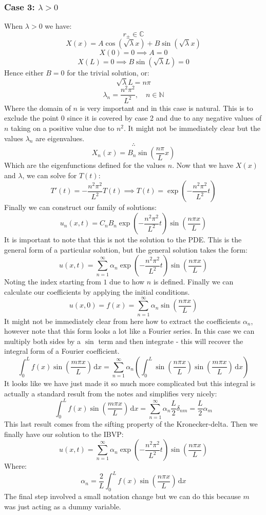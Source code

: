 \documentclass[12pt]{article}
\begin{document}
\subsubsection{Case 3: \(\lambda>0\)}
When \(\lambda>0\) we have:
\[r_{\pm}\in \mathbb{C}\]
\[X(x)=A\cos(\sqrt{\lambda}x)+B\sin(\sqrt{\lambda}x)\]
\[X(0)=0\implies A=0\]
\[X(L)=0\implies B\sin(\sqrt{\lambda}L)=0\]
Hence either \(B=0\) for the trivial solution, or:
\[\sqrt{\lambda}L=n\pi\]
\[\lambda_n=\frac{n^2\pi^2}{L^2},\quad n\in\mathbb{N}\]
Where the domain of \(n\) is very important and in this case is natural. This is to exclude the point \(0\) since it is covered by case 2 and due to any negative values of \(n\) taking on a positive value due to \(n^2\). It might not be immediately clear but the values \(\lambda_n\) are eigenvalues.
\[\therefore\]
\[X_n(x)=B_n\sin\left(\frac{n\pi}{L}x\right)\]
Which are the eigenfunctions defined for the values \(n\). Now that we have \(X(x)\) and \(\lambda\), we can solve for \(T(t)\):
\[T'(t)=-\frac{n^2\pi^2}{L^2}T(t)\implies T(t)=\exp\left(-\frac{n^2\pi^2}{L^2}t\right)\]
Finally we can construct our family of solutions:
\[u_n(x,t)=C_nB_n\exp\left(-\frac{n^2\pi^2}{L^2}t\right)\sin\left(\frac{n\pi x}{L}\right)\]
It is important to note that this is not the solution to the PDE. This is the general form of a particular solution, but the general solution takes the form:
\[u(x,t)=\sum^\infty_{n=1}\alpha_n\exp\left(-\frac{n^2\pi^2}{L^2}t\right)\sin\left(\frac{n\pi x}{L}\right)\]
Noting the index starting from \(1\) due to how \(n\) is defined. Finally we can calculate our coefficients by applying the initial conditions.
\[u(x,0)=f(x)=\sum^\infty_{n=1}\alpha_n\sin\left(\frac{n\pi x}{L}\right)\]
It might not be immediately clear from here how to extract the coefficients \(\alpha_n\), however note that this form looks a lot like a Fourier series. In this case we can multiply both sides by a \(\sin\) term and then integrate - this will recover the integral form of a Fourier coefficient.
\[\int^L_0f(x)\sin\left(\frac{m\pi x}{L}\right)\,\text{d}x=\sum^\infty_{n=1}\alpha_n\left(\int^L_0\sin\left(\frac{n\pi x}{L}\right)\sin\left(\frac{m\pi x}{L}\right)\,\text{d}x\right)\]
It looks like we have just made it so much more complicated but this integral is actually a standard result from the notes and simplifies very nicely:
\[\int^L_0f(x)\sin\left(\frac{m\pi x}{L}\right)\,\text{d}x=\sum^\infty_{n=1}\alpha_n\frac{L}{2}\delta_{nm}=\frac{L}{2}\alpha_m\]
This last result comes from the sifting property of the Kronecker-delta. Then we finally have our solution to the IBVP:
\[u(x,t)=\sum^\infty_{n=1}\alpha_n\exp\left(-\frac{n^2\pi^2}{L^2}t\right)\sin\left(\frac{n\pi x}{L}\right)\]
Where:
\[\alpha_n=\frac{2}{L}\int^L_0f(x)\sin\left(\frac{n\pi x}{L}\right)\,\text{d}x\]
The final step involved a small notation change but we can do this because \(m\) was just acting as a dummy variable.
\end{document}
